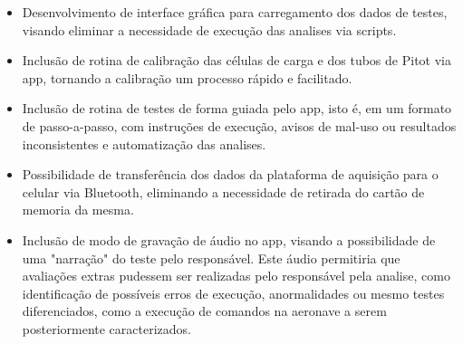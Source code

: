 \begin{itemize}
    \item Desenvolvimento de interface gráfica para carregamento dos dados de testes, visando eliminar a necessidade de execução das analises via scripts.
    \item Inclusão de rotina de calibração das células de carga e dos tubos de Pitot via app, tornando a calibração um processo rápido e facilitado.
    \item Inclusão de rotina de testes de forma guiada pelo app, isto é, em um formato de passo-a-passo, com instruções de execução, avisos de mal-uso ou resultados inconsistentes e automatização das analises.
    \item Possibilidade de transferência dos dados da plataforma de aquisição para o celular via Bluetooth, eliminando a necessidade de retirada do cartão de memoria da mesma.
    \item Inclusão de modo de gravação de áudio no app, visando a possibilidade de uma "narração" do teste pelo responsável. Este áudio permitiria que avaliações extras pudessem ser realizadas pelo responsável pela analise, como identificação de possíveis erros de execução, anormalidades ou mesmo testes diferenciados, como a execução de comandos na aeronave a serem posteriormente caracterizados. 
\end{itemize}
